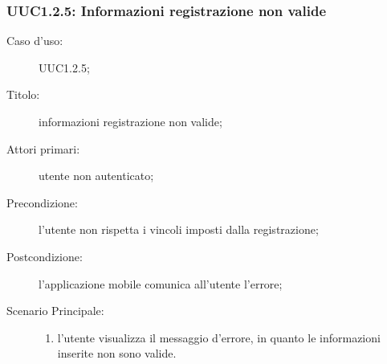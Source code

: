 \documentclass[../../../analisi-dei-requisiti.tex]{subfiles}
\begin{document}
\subsubsection{UUC1.2.5: Informazioni registrazione non valide}%
\label{subs:UUC1.2.5}
\begin{description}
  \item[Caso d’uso:] UUC1.2.5;
  \item[Titolo:] informazioni registrazione non valide;
  \item[Attori primari:] utente non autenticato;
  \item[Precondizione:] l'utente non rispetta i vincoli imposti dalla registrazione;
  \item[Postcondizione:] l'applicazione mobile comunica all'utente l'errore;
  \item[Scenario Principale:]
        \begin{enumerate}
          \item l'utente visualizza il messaggio d'errore, in quanto le informazioni inserite non sono valide.
        \end{enumerate}
\end{description}
\end{document}
